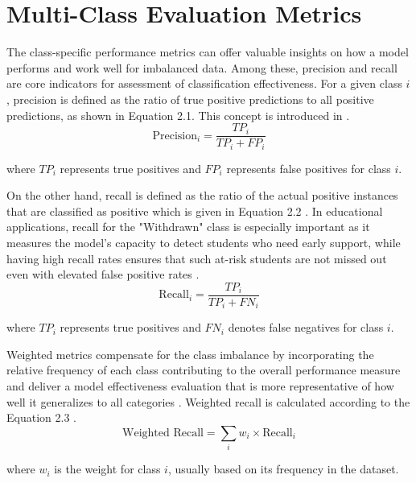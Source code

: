 \documentclass[ %
                    author={Carlos Duran Calle},
                supervisor={Dr. Felipe Campelo},
                    degree={MSc},
                     title={Comparative Machine Learning Analysis for Student Dropout Prediction in a Virtual Learning Environment},
                  subtitle={Incorporating Student Engagement and Socio-Economic Features},
                      type={},
                      year={2025}]{dissertation}
\begin{document}
\section{Multi-Class Evaluation Metrics}
The class-specific performance metrics can offer valuable insights on how a model performs and work well for imbalanced data. Among these, precision and recall are core indicators for assessment of classification effectiveness. For a given class $i$, precision is defined as the ratio of true positive predictions to all positive predictions, as shown in Equation 2.1. This concept is introduced in \cite{sokolova_classification_tasks_2009}.
\begin{equation}
	\text{Precision}_{i} = \frac{TP_{i}}{TP_{i} + FP_{i}}
	\tag{2.1}
\end{equation}
\begin{center}
	where $TP_{i}$ represents true positives and $FP_{i}$ represents false positives for class $i$.
\end{center}

On the other hand, recall is defined as the ratio of the actual positive instances that are classified as positive which is given in Equation 2.2 \cite{sokolova_classification_tasks_2009}. In educational applications, recall for the "Withdrawn" class is especially important as it measures the model's capacity to detect students who need early support, while having high recall rates ensures that such at-risk students are not missed out even with elevated false positive rates \cite{grandini_metrics_2020}.
\begin{equation}
	\text{Recall}_{i} = \frac{TP_{i}}{TP_{i} + FN_{i}}
	\tag{2.2}
\end{equation}
\begin{center}
	where $TP_{i}$ represents true positives and $FN_{i}$ denotes false negatives for class $i$.
\end{center}

Weighted metrics compensate for the class imbalance by incorporating the relative frequency of each class contributing to the overall performance measure and deliver a model effectiveness evaluation that is more representative of how well it generalizes to all categories \cite{jeni_facing_2013}. Weighted recall is calculated according to the Equation 2.3 \cite{tantisripreecha_novel_2022}.
\begin{equation}
	\text{Weighted Recall} = \sum_{i} w_{i} \times \text{Recall}_{i}
	\tag{2.3}
\end{equation}
\begin{center}
	where $w_{i}$ is the weight for class $i$, usually based on its frequency in the dataset.
\end{center}
\end{document}
